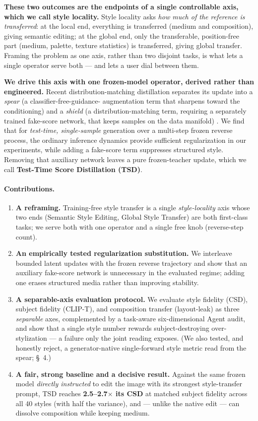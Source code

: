 \documentclass[letterpaper]{article} %
\begin{document}
\textbf{These two outcomes are the endpoints of a single controllable axis,
which we call style locality.} Style locality asks \emph{how much of the
reference is transferred}: at the local end, everything is transferred
(medium and composition), giving semantic editing; at the global end, only
the transferable, position-free part (medium, palette, texture statistics) is
transferred, giving global transfer. Framing the problem as one axis, rather
than two disjoint tasks, is what lets a single operator serve both --- and
lets a user dial between them.

\textbf{We drive this axis with one frozen-model operator, derived rather
than engineered.} Recent distribution-matching distillation \citep{yin2024dmd}
separates its update into a \emph{spear} (a classifier-free-guidance-
augmentation term that sharpens toward the conditioning) and a \emph{shield}
(a distribution-matching term, requiring a separately trained fake-score
network, that keeps samples on the data manifold) \citep{liu2025decoupled}.
We find that for \emph{test-time, single-sample} generation over a multi-step
frozen reverse process, the ordinary inference dynamics provide sufficient
regularization in our experiments, while adding a fake-score term suppresses
structured style. Removing that auxiliary network leaves a pure
frozen-teacher update, which we call \textbf{Test-Time Score Distillation
(TSD)}.

\paragraph{Contributions.}
\begin{enumerate}
\item \textbf{A reframing.} Training-free style transfer is a single
\emph{style-locality} axis whose two ends (Semantic Style Editing, Global
Style Transfer) are both first-class tasks; we serve both with one operator
and a single free knob (reverse-step count).
\item \textbf{An empirically tested regularization substitution.} We
interleave bounded latent updates with the frozen reverse trajectory and show
that an auxiliary fake-score network is unnecessary in the evaluated regime;
adding one erases structured media rather than improving stability.
\item \textbf{A separable-axis evaluation protocol.} We evaluate style
fidelity (CSD), subject fidelity (CLIP-T), and composition transfer
(layout-leak) as three \emph{separable} axes, complemented by a task-aware
six-dimensional Agent audit, and show that a single style number rewards
subject-destroying over-stylization --- a failure only the joint reading
exposes. (We also tested, and honestly reject, a
generator-native single-forward style metric read from the spear; \S~4.)
\item \textbf{A fair, strong baseline and a decisive result.} Against the
same frozen model \emph{directly instructed} to edit the image with its
strongest style-transfer prompt, TSD reaches \textbf{2.5--2.7$\times$ its
CSD} at matched subject fidelity across all 40 styles (with half the
variance), and --- unlike the native edit --- can dissolve composition while
keeping medium.
\end{enumerate}
\end{document}
